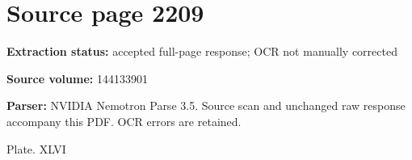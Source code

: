 \clearpage
\section{Source page 2209}
\textbf{Extraction status:} accepted full-page response; OCR not manually corrected\par
\textbf{Source volume:} 144133901\par
\textbf{Parser:} NVIDIA Nemotron Parse 3.5. Source scan and unchanged raw response accompany this PDF. OCR errors are retained.\par\medskip
Plate. XLVI\par\medskip
